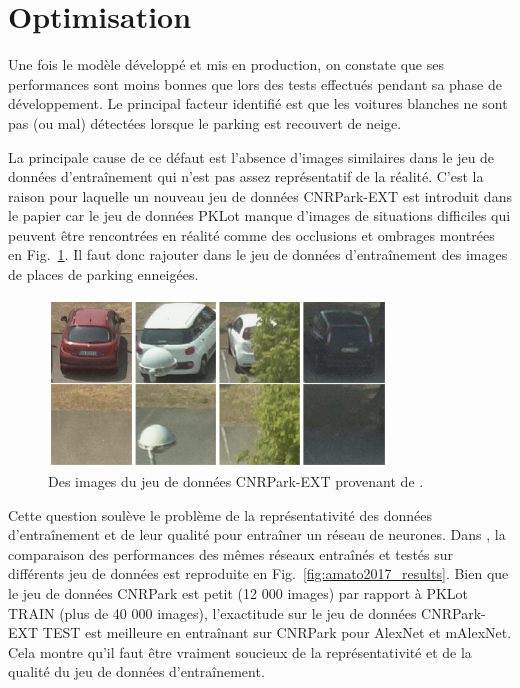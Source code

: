 \documentclass[12pt]{article}
\begin{document}
\section{Optimisation}

Une fois le modèle développé et mis en production, on constate que ses performances sont moins bonnes que lors des tests effectués pendant sa phase de développement. Le principal facteur identifié est que les voitures blanches ne sont pas (ou mal) détectées lorsque le parking est recouvert de neige.

La principale cause de ce défaut est l'absence d'images similaires dans le jeu de données d'entraînement qui n'est pas assez représentatif de la réalité. C'est la raison pour laquelle un nouveau jeu de données CNRPark-EXT est introduit dans le papier \citep{Amato2017} car le jeu de données PKLot \citep{deAlmeida2015} manque d'images de situations difficiles qui peuvent être rencontrées en réalité comme des occlusions et ombrages montrées en Fig.~\ref{fig:cnrpark_ext}. Il faut donc rajouter dans le jeu de données d'entraînement des images de places de parking enneigées.

\begin{figure}[htbp]
    \centering
    \includegraphics[width=0.8\textwidth]{figures/datasets/cnrpark_ext.png}
    \caption{Des images du jeu de données CNRPark-EXT provenant de \cite{Amato2017}.}
    \label{fig:cnrpark_ext}
\end{figure}

Cette question soulève le problème de la représentativité des données d'entraînement et de leur qualité pour entraîner un réseau de neurones. Dans \cite{Amato2017}, la comparaison des performances des mêmes réseaux entraînés et testés sur différents jeu de données est reproduite en Fig.~\ref{fig:amato2017_results}. Bien que le jeu de données CNRPark est petit (12 000 images) par rapport à PKLot TRAIN (plus de 40 000 images), l'exactitude sur le jeu de données CNRPark-EXT TEST est meilleure en entraînant sur CNRPark pour AlexNet et mAlexNet. Cela montre qu'il faut être vraiment soucieux de la représentativité et de la qualité du jeu de données d'entraînement.
\end{document}
